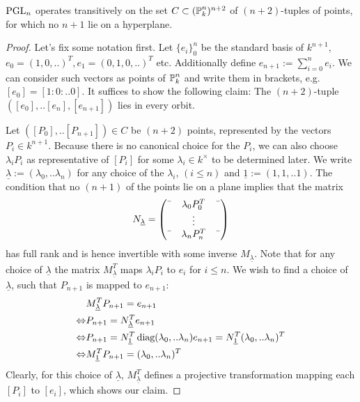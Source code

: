 \begin{theorem} \label{theoremGroupAction}
${\operatorname{PGL}}_n$ operates transitively on the set $C \subset (\operatorname{\mathbb P}^n_k)^{n+2}$ of $(n+2)$-tuples of points, for which no $n+1$ lie on a hyperplane.
\end{theorem}
\begin{proof}
Let's fix some notation first. Let $\{ e_i \}_0^n$ be the standard basis of $k^{n+1}$, $e_0 = (1,0,..)^T, e_1 = (0,1,0,..)^T$ etc.
Additionally define $e_{n+1} := \sum_{i=0}^n e_i$.
We can consider such vectors as points of $\operatorname{\mathbb P}^n_k$ and write them in brackets, e.g. $[e_0] = [1:0:..0]$.
It suffices to show the following claim: The $(n+2)$-tuple $([e_0],..[e_n],[e_{n+1}])$ lies in every orbit.

Let $([P_0],..[P_{n+1}]) \in C$ be $(n+2)$ points, represented by the vectors $P_i \in k^{n+1}$.
Because there is no canonical choice for the $P_i$, we can also choose $\lambda_i P_i$ as representative of $[P_i]$ for some $\lambda_i \in k^\times$ to be determined later.
We write $\underline \lambda  := (\lambda_0,..\lambda_n)$ for any choice of the $\lambda_i,\,(i\leq n)$ and $\underline 1 := (1,1,..1)$.
The condition that no $(n+1)$ of the points lie on a plane implies that the matrix
\begin{equation}
N_{\underline\lambda}
=
\begin{pmatrix}
\textemdash & \lambda_0 P_0^T & \textemdash \\
& \vdots &  \\
\textemdash & \lambda_n P_n^T & \textemdash \\
\end{pmatrix}
\end{equation}
has full rank and is hence invertible with some inverse $M_{\underline\lambda}$.
Note that for any choice of $\underline\lambda$ the matrix $M_{\underline\lambda}^T$ maps $\lambda_iP_i$ to $e_i$ for $i \leq  n$.
We wish to find a choice of $\underline\lambda$, such that $P_{n+1}$ is mapped to $e_{n+1}$:
\begin{align}
& M_{\underline\lambda}^TP_{n+1} = e_{n+1} \\
\Leftrightarrow & P_{n+1} = N_{\underline\lambda}^T e_{n+1} \\
\Leftrightarrow & P_{n+1} = N_{\underline 1}^T \operatorname{\text{diag}}(\lambda_0,..\lambda_n) e_{n+1}
                          = N_{\underline 1}^T (\lambda_0,..\lambda_n)^T \\
\Leftrightarrow & M_{\underline 1}^T P_{n+1} = (\lambda_0,..\lambda_n)^T
\end{align}
Clearly, for this choice of $\underline\lambda$, $M_{\underline \lambda}^T$ defines a projective transformation mapping each $[P_i]$ to $[e_i]$, which shows our claim.
\end{proof}

